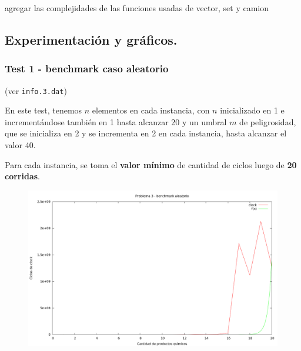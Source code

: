 agregar las complejidades de las funciones usadas de vector, set y camion

\vspace*{0.75cm} \noindent


\newpage
\subsection{Experimentación y gráficos.}

\vspace*{0.3cm}

\subsubsection{Test 1 - benchmark caso aleatorio}

(ver \verb|info.3.dat|) \medskip

En este test, tenemos $n$ elementos en cada instancia, con $n$ inicializado en 1 e incrementándose
también en 1 hasta alcanzar 20 y un umbral $m$ de peligrosidad, que se inicializa en 2 y se incrementa
en 2 en cada instancia, hasta alcanzar el valor 40.

Para cada instancia, se toma el \textbf{valor mínimo} de cantidad de ciclos luego de \textbf{20 corridas}.

\vspace*{0.5cm}

\begin{figure}[h]
  \begin{center}
    \includegraphics[scale=0.35]{imagenes/grafico-3.png}
  \end{center}
\end{figure}

\vspace*{0.5cm}

